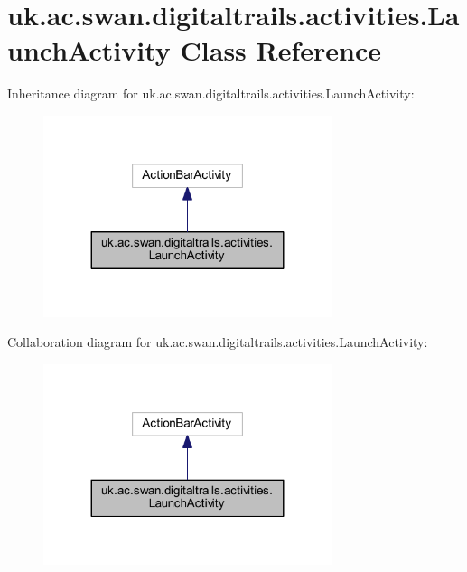 \hypertarget{classuk_1_1ac_1_1swan_1_1digitaltrails_1_1activities_1_1_launch_activity}{\section{uk.\+ac.\+swan.\+digitaltrails.\+activities.\+Launch\+Activity Class Reference}
\label{classuk_1_1ac_1_1swan_1_1digitaltrails_1_1activities_1_1_launch_activity}
}


Inheritance diagram for uk.\+ac.\+swan.\+digitaltrails.\+activities.\+Launch\+Activity\+:\nopagebreak
\begin{figure}[H]
\begin{center}
\leavevmode
\includegraphics[width=239pt]{classuk_1_1ac_1_1swan_1_1digitaltrails_1_1activities_1_1_launch_activity__inherit__graph}
\end{center}
\end{figure}


Collaboration diagram for uk.\+ac.\+swan.\+digitaltrails.\+activities.\+Launch\+Activity\+:\nopagebreak
\begin{figure}[H]
\begin{center}
\leavevmode
\includegraphics[width=239pt]{classuk_1_1ac_1_1swan_1_1digitaltrails_1_1activities_1_1_launch_activity__coll__graph}
\end{center}
\end{figure}

